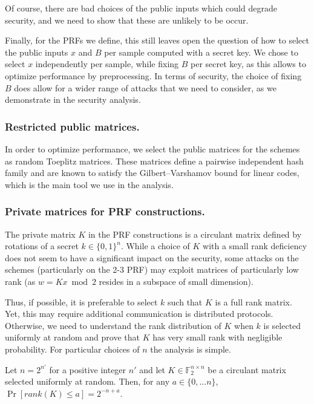 \documentclass[orivec,envcountsect]{llncs}
\begin{document}
Of course, there are bad choices of the public inputs which could degrade security,
and we need to show that these are unlikely to be occur.

Finally, for the PRFs we define, this still leaves open the question of how to select the public inputs $x$ and $B$
per sample computed with a secret key. We chose to select $x$ independently per sample,
while fixing $B$ per secret key, as this allows to optimize performance by preprocessing.
In terms of security, the choice of fixing $B$ does allow for a wider range of attacks
that we need to consider, as we demonstrate in the security analysis.

\subsubsection{Restricted public matrices.}
In order to optimize performance, we select the public matrices
for the schemes as random Toeplitz matrices. These matrices
define a pairwise independent hash family and are known to satisfy the
Gilbert–Varshamov bound for linear codes, which is the main tool we use in the analysis.

\subsubsection{Private matrices for PRF constructions.}
The private matrix $K$ in the PRF constructions is a circulant matrix 
defined by rotations of a secret $k \in \{0,1\}^n$.
While a choice of $K$ with a small rank deficiency does not seem to 
have a significant impact on the security, 
some attacks on the schemes (particularly on the 2-3 PRF) may exploit 
matrices of particularly low rank 
(as $w = Kx \bmod 2$ resides in a subspace of small dimension).

Thus, if possible, it is preferable to select $k$ such that $K$ 
is a full rank matrix. Yet, this may require additional communication 
is distributed protocols. 
Otherwise, we need to understand the rank distribution of $K$
when $k$ is selected uniformly at random and prove that $K$ 
has very small rank with negligible probability.
For particular choices of $n$ the analysis is simple.
\begin{proposition}
\label{prop:rank}
Let $n = 2^{n'}$ for a positive integer $n'$ 
and let $K \in \mathbb{F}_2^{n \times n}$ 
be a circulant matrix selected uniformly at random.
Then, for any $a \in \{0,\ldots n\}$, 
$\Pr[rank(K) \leq a] = 2^{-n+a}$.
\end{proposition}
\end{document}
